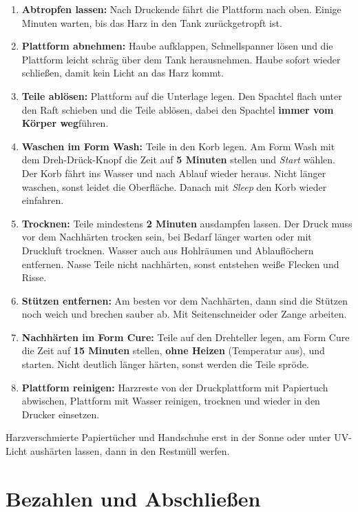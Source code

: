 \documentclass{\basedir/fablab-document}
\begin{document}
\begin{enumerate}
	\item \textbf{Abtropfen lassen:} Nach Druckende fährt die Plattform nach oben. Einige Minuten warten, bis das Harz in den Tank zurückgetropft ist.
	\item \textbf{Plattform abnehmen:} Haube aufklappen, Schnellspanner lösen und die Plattform leicht schräg über dem Tank herausnehmen. Haube sofort wieder schließen, damit kein Licht an das Harz kommt.
	\item \textbf{Teile ablösen:} Plattform auf die Unterlage legen. Den Spachtel flach unter den Raft schieben und die Teile ablösen, dabei den Spachtel \textbf{immer vom Körper weg}führen.
	\item \textbf{Waschen im Form Wash:} Teile in den Korb legen. Am Form Wash mit dem Dreh-Drück-Knopf die Zeit auf \textbf{5 Minuten} stellen und \textit{Start} wählen. Der Korb fährt ins Wasser und nach Ablauf wieder heraus. Nicht länger waschen, sonst leidet die Oberfläche. Danach mit \textit{Sleep} den Korb wieder einfahren.
	\item \textbf{Trocknen:} Teile mindestens \textbf{2 Minuten} ausdampfen lassen. Der Druck muss vor dem Nachhärten trocken sein, bei Bedarf länger warten oder mit Druckluft trocknen. Wasser auch aus Hohlräumen und Ablauflöchern entfernen. Nasse Teile nicht nachhärten, sonst entstehen weiße Flecken und Risse.
	\item \textbf{Stützen entfernen:} Am besten vor dem Nachhärten, dann sind die Stützen noch weich und brechen sauber ab. Mit Seitenschneider oder Zange arbeiten.
	\item \textbf{Nachhärten im Form Cure:} Teile auf den Drehteller legen, am Form Cure die Zeit auf \textbf{15 Minuten} stellen, \textbf{ohne Heizen} (Temperatur aus), und starten. Nicht deutlich länger härten, sonst werden die Teile spröde.
	\item \textbf{Plattform reinigen:} Harzreste von der Druckplattform mit Papiertuch abwischen, Plattform mit Wasser reinigen, trocknen und wieder in den Drucker einsetzen.
\end{enumerate}

Harzverschmierte Papiertücher und Handschuhe erst in der Sonne oder unter UV-Licht aushärten lassen, dann in den Restmüll werfen.

\section{Bezahlen und Abschließen}
\end{document}
